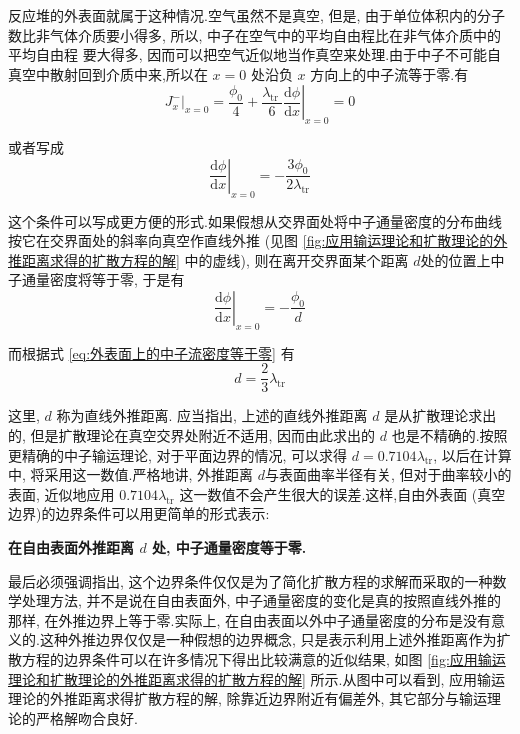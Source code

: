 \documentclass{Sichuan Normal University}
\begin{document}
\begin{itemize}
反应堆的外表面就属于这种情况.空气虽然不是真空, 但是, 由于单位体积内的分子数比非气体介质要小得多, 所以, 中子在空气中的平均自由程比在非气体介质中的平均自由程
要大得多, 因而可以把空气近似地当作真空来处理.由于中子不可能自真空中散射回到介质中来,所以在 $x=0$ 处沿负 $x$ 方向上的中子流等于零.有
\begin{equation}
\left.J_x^{-}\right|_{x=0}=\frac{\phi_0}{4}+\left.\frac{\lambda_{\text {tr }}}{6} \frac{\mathrm{d} \phi}{\mathrm{d} x}\right|_{x=0}=0
\end{equation}

或者写成
\begin{equation}
\left.\frac{\mathrm{d} \phi}{\mathrm{d} x}\right|_{x=0}=-\frac{3 \phi_0}{2 \lambda_{\mathrm{tr}}}
\label{eq:外表面上的中子流密度等于零}
\end{equation}

这个条件可以写成更方便的形式.如果假想从交界面处将中子通量密度的分布曲线按它在交界面处的斜率向真空作直线外推 (见图 \ref{fig:应用输运理论和扩散理论的外推距离求得的扩散方程的解} 中的虚线), 则在离开交界面某个距离 $d$处的位置上中子通量密度将等于零, 于是有
\begin{equation}
\left.\frac{\mathrm{d} \phi}{\mathrm{d} x}\right|_{x=0}=-\frac{\phi_0}{d}
\end{equation}

而根据式 \eqref{eq:外表面上的中子流密度等于零} 有
\begin{equation}
d=\frac{2}{3} \lambda_{\mathrm{tr}}
\end{equation}

这里, $d$ 称为直线外推距离.
应当指出, 上述的直线外推距离 $d$ 是从扩散理论求出的, 但是扩散理论在真空交界处附近不适用, 因而由此求出的 $d$ 也是不精确的.按照更精确的中子输运理论, 对于平面边界的情况, 可以求得 $d=0.7104 \lambda_{\mathrm{tr}}$, 以后在计算中, 将采用这一数值.严格地讲, 外推距离 $d$与表面曲率半径有关, 但对于曲率较小的表面, 近似地应用 $0.7104 \lambda_{\mathrm{tr}}$ 这一数值不会产生很大的误差.这样,自由外表面 (真空边界)的边界条件可以用更简单的形式表示:

\textbf{在自由表面外推距离 $d$ 处, 中子通量密度等于零.}

最后必须强调指出, 这个边界条件仅仅是为了简化扩散方程的求解而采取的一种数学处理方法, 并不是说在自由表面外, 中子通量密度的变化是真的按照直线外推的那样, 在外推边界上等于零.实际上, 在自由表面以外中子通量密度的分布是没有意义的.这种外推边界仅仅是一种假想的边界概念, 只是表示利用上述外推距离作为扩散方程的边界条件可以在许多情况下得出比较满意的近似结果, 如图 \ref{fig:应用输运理论和扩散理论的外推距离求得的扩散方程的解} 所示.从图中可以看到, 应用输运理论的外推距离求得扩散方程的解, 除靠近边界附近有偏差外, 其它部分与输运理论的严格解吻合良好.



\end{itemize}
\end{document}
